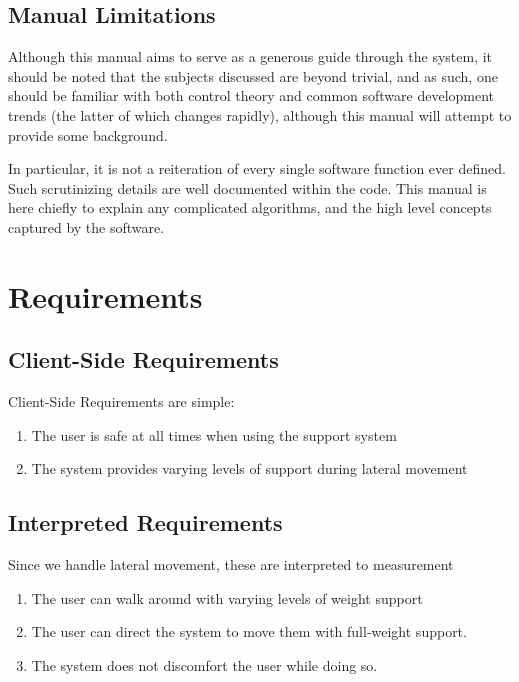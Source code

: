 \documentclass[letterpaper]{article}
\begin{document}
\subsection{Manual Limitations}
Although this manual aims to serve as a generous guide through the system, it should be noted that the subjects discussed are beyond trivial, and as such, one should be familiar with both control theory and common software development trends (the latter of which changes rapidly), although this manual will attempt to provide some background.

In particular, it is not a reiteration of every single software function ever defined. Such scrutinizing details are well documented within the code. This manual is here chiefly to explain any complicated algorithms, and the high level concepts captured by the software.

\newpage

\section{Requirements}
\subsection{Client-Side Requirements}
Client-Side Requirements are simple:
\begin{enumerate}
    \item The user is safe at all times when using the support system
    \item The system provides varying levels of support during lateral movement
\end{enumerate}
\subsection{Interpreted Requirements}
Since we handle lateral movement, these are interpreted to measurement
\begin{enumerate}
    \item The user can walk around with varying levels of weight support
    \item The user can direct the system to move them with full-weight support.
    \item The system does not discomfort the user while doing so.
\end{enumerate}

\end{document}
